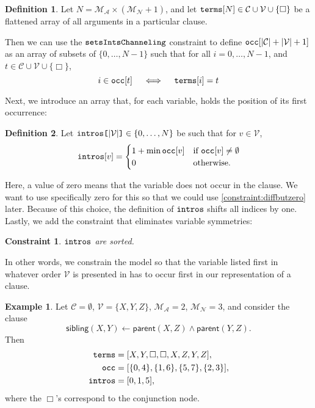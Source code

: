 \documentclass[letterpaper]{article}
\newtheorem{constraint}{Constraint}
\theoremstyle{definition}
\newtheorem{definition}{Definition}
\newtheorem{example}{Example}
\newcommand{\variable}[1]{\texttt{\textup{#1}}}
\newcommand{\arrayd}[3]{\variable{{#1}[}{#2}\variable{]} \in {#3}}
\newcommand{\variables}{\mathcal{V}}
\newcommand{\constants}{\mathcal{C}}
\newcommand{\maxArity}{\mathcal{M}_{\mathcal{A}}}
\newcommand{\maxNumNodes}{\mathcal{M}_{\mathcal{N}}}
\begin{document}
\begin{definition}
  Let $N = \maxArity{} \times (\maxNumNodes{} + 1)$, and let
  $\variable{terms}[N] \in \constants{} \cup \variables{} \cup \{ \Box
  \}$ be a flattened array of all arguments in a particular clause.

  Then we can use the $\variable{setsIntsChanneling}$ constraint
  to define $\variable{occ}[|\constants{}| + |\variables{}| + 1]$ as an
  array of subsets of $\{ 0, \dots, N-1 \}$ such that for all $i = 0, \dots, N
  - 1$, and $t \in \constants{} \cup \variables{} \cup \{ \Box \}$,
  \[
    i \in \variable{occ}[t] \quad \iff \quad
    \variable{terms}[i] = t
  \]
\end{definition}

Next, we introduce an array that, for each variable, holds the position of its
first occurrence:

\begin{definition}
  Let $\arrayd{intros}{|\variables{}|}{\{ 0, \dots, N \}}$ be such that
  for $v \in \variables{}$,
  \[
    \variable{intros}[v] = \begin{cases}
      1 + \min \variable{occ}[v] & \text{if }
      \variable{occ}[v] \ne \emptyset\\
      0 & \text{otherwise.}
    \end{cases}
  \]
\end{definition}

Here, a value of zero means that the variable does not occur in the clause. We
want to use specifically zero for this so that we could use
\cref{constraint:diffbutzero} later. Because of this choice, the definition of
$\variable{intros}$ shifts all indices by one. Lastly, we add the constraint
that eliminates variable symmetries:

\begin{constraint}
  $\variable{intros}$ are sorted.
\end{constraint}

In other words, we constrain the model so that the variable listed first in
whatever order $\variables{}$ is presented in has to occur first in our
representation of a clause.

\begin{example} \label{example:sibling}
  Let $\constants{} = \emptyset$, $\variables{} = \{ X, Y, Z \}$, $\maxArity{} =
  2$, $\maxNumNodes{} = 3$, and consider the clause
  \[
    \mathsf{sibling}(X, Y) \gets \mathsf{parent}(X, Z) \land
    \mathsf{parent}(Y, Z).
  \]
  Then
  \begin{align*}
    \variable{terms} &= [X, Y, \Box, \Box, X, Z, Y, Z], \\
    \variable{occ} &= [\{ 0, 4 \}, \{ 1, 6 \}, \{ 5, 7 \}, \{ 2, 3 \}], \\
    \variable{intros} &= [0, 1, 5],
  \end{align*}
  where the $\Box$'s correspond to the conjunction node.
\end{example}
\end{document}
